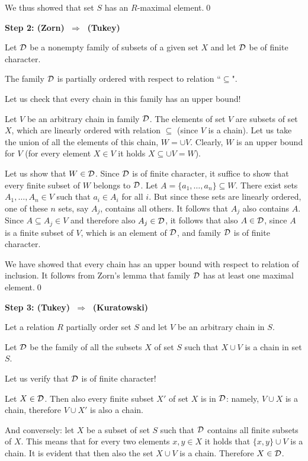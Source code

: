\documentclass[11pt,paper=b5,footinclude,headinclude]{scrbook} %
\def\sledi {{~\Rightarrow~}}
\theoremstyle{remark}
\theoremstyle{definition} %
\theoremstyle{theorem} %
\begin{document}
We thus showed that set $S$ has an $R$-maximal element.\qed

\bigskip
\textbf{ Step 2: (Zorn) $\sledi$ (Tukey)}

Let  ${\cal D}$ be a nonempty family of subsets of a given set $X$ and let ${\cal D}$ be of finite character.

The family ${\cal D}$ is partially ordered with respect to relation ``$\subseteq$".

Let us check that every chain in this family has an upper bound!

Let $V$ be an arbitrary chain in family ${\cal D}$.
The elements of set $V$ are subsets of set $X$, which are linearly ordered with relation $\subseteq$
(since $V$ is a chain).
Let us take the union of all the elements of this chain, $W = \cup V$.
Clearly, $W$ is an upper bound for $V$ (for every element $X\in V$ it holds $X\subseteq \cup V = W$).

Let us show that $W\in{\cal D}$. Since ${\cal D}$ is of finite character, it suffice to show that every finite subset of
$W$ belongs to ${\cal D}$.
Let $A=\{a_1,\ldots, a_n\}\subseteq W$. There exist sets $A_1,\ldots, A_n\in V$ such that $a_i\in A_i$ for all $i$.
But since these sets are linearly ordered, one of these $n$ sets, say $A_j$, contains all others.
It follows that $A_j$ also contains $A$. Since $A\subseteq A_j\in V$ and therefore also  $A_j\in {\cal D}$,
it follows that also $A\in {\cal D}$, since $A$ is a finite subset of $V$, which is an element of
${\cal D}$, and family ${\cal D}$ is of finite character.

We have showed that every chain has an upper bound with respect to relation of inclusion.
It follows from Zorn's lemma that family ${\cal D}$ has at least one maximal element.\qed

\bigskip
\textbf{ Step 3: (Tukey) $\sledi$ (Kuratowski)}

Let a relation $R$ partially order set $S$ and let $V$ be an arbitrary chain in $S$.

Let ${\cal D}$ be the family of all the subsets $X$ of set $S$ such that
$X\cup V$ is a chain in set $S$.

Let us verify that ${\cal D}$ is of finite character!

Let $X\in {\cal D}$. Then also every finite subset $X'$ of set $X$ is in ${\cal D}$:
namely, $V\cup X$ is a chain, therefore $V\cup X'$ is also a chain.

And conversely: let $X$ be a subset of set $S$ such that ${\cal D}$ contains all finite subsets of $X$.
This means that for every two elements $x,y\in X$ it holds that
$\{x,y\}\cup V$ is a chain. It is evident that then also the set $X\cup V$ is a chain. Therefore $X\in {\cal D}$.
\end{document}
